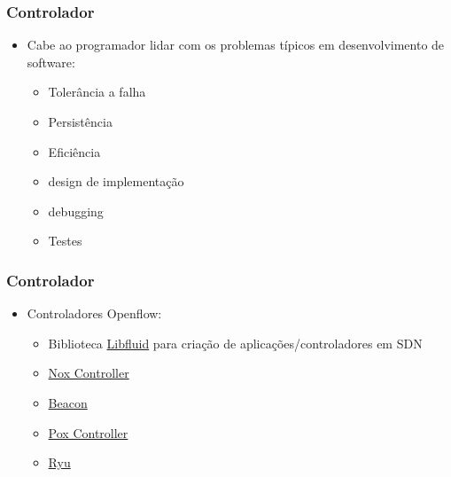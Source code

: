 %
%
\begin{frame}\frametitle{Controlador}

    \begin{itemize}
    \item Cabe ao programador lidar com os problemas típicos em 
          desenvolvimento de software:
          \begin{itemize}
          \item Tolerância a falha
          \item Persistência
          \item Eficiência
          \item design de implementação
          \item debugging
          \item Testes
          \end{itemize}
    \end{itemize}
\end{frame}

%
%
\begin{frame}\frametitle{Controlador}

    \begin{itemize}
    \item Controladores Openflow:
          \begin{itemize}
          \item Biblioteca \href{http://opennetworkingfoundation.github.io/libfluid/index.html}{Libfluid}
                para criação de aplicações/controladores em SDN
          \item \href{http://www.noxrepo.org/nox/about-nox/}{Nox Controller}
          \item \href{https://openflow.stanford.edu/display/Beacon/Home}{Beacon}
          \item \href{http://www.noxrepo.org/pox/about-pox/}{Pox Controller}
          \item \href{http://osrg.github.io/ryu/}{Ryu}
          \end{itemize}
    \end{itemize}
\end{frame}


